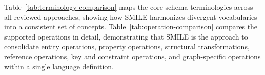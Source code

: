 Table~\ref{tab:terminology-comparison} maps the core schema terminologies across all reviewed approaches, showing how SMILE  harmonizes divergent vocabularies into a consistent set of concepts. Table~\ref{tab:operation-comparison} compares the supported operations in detail, demonstrating that SMILE  is the approach to consolidate entity operations, property operations, structural transformations, reference operations, key and constraint operations, and graph-specific operations within a single language definition.

\begin{table}[h!]
\centering
\caption{Terminology mapping of core schema concepts across existing approaches and \textsc{SMILE }}
\label{tab:terminology-comparison}
{}
\end{table}
